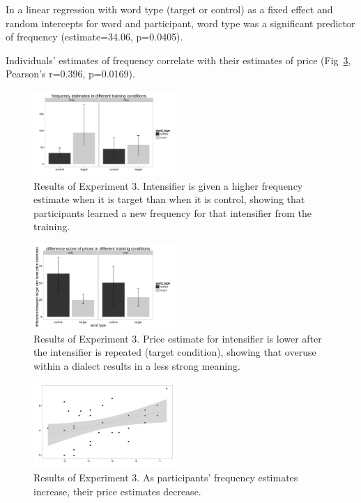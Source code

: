 \documentclass[10pt,letterpaper]{article}
\begin{document}
In a linear regression with word type (target or control) as a fixed effect and random intercepts for word and participant, word type was a significant predictor of frequency (estimate=34.06, p=0.0405).

Individuals' estimates of frequency correlate with their estimates of price (Fig~\ref{exp3-scatterplot}, Pearson's r=0.396, p=0.0169).

\begin{figure}[ht]
\begin{center}
\includegraphics[width=0.48\textwidth]{analysis_files_for_writeup/images/exp3-freq-plot}
\end{center}
\caption{Results of Experiment 3. Intensifier is given a higher frequency estimate when it is target than when it is control, showing that participants learned a new frequency for that intensifier from the training.} 
\label{exp3-freq-plot}
\end{figure}

\begin{figure}[ht]
\begin{center}
\includegraphics[width=0.48\textwidth]{analysis_files_for_writeup/images/exp3-price-plot.png}
\end{center}
\caption{Results of Experiment 3. Price estimate for intensifier is lower after the intensifier is repeated (target condition), showing that overuse within a dialect results in a less strong meaning.} 
\label{exp3-price-plot}
\end{figure}

\begin{figure}[ht]
\begin{center}
\includegraphics[width=0.48\textwidth]{analysis_files_for_writeup/images/exp3-scatterplot.png}
\end{center}
\caption{Results of Experiment 3. As participants' frequency estimates increase, their price estimates decrease.} 
\label{exp3-scatterplot}
\end{figure}
\end{document}
